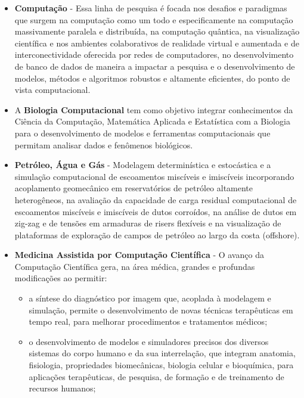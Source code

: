 \begin{itemize}
	\item \textbf{Computação} - Essa linha de pesquisa é focada nos desafios e
		paradigmas que surgem na computação como um todo e especificamente na
		computação massivamente paralela e distribuída, na computação quântica,
		na visualização científica e nos ambientes colaborativos de realidade
		virtual e aumentada e de interconectividade oferecida por redes de
		computadores, no desenvolvimento de banco de dados de maneira a impactar
		a pesquisa e o desenvolvimento de modelos, métodos e algoritmos robustos
		e altamente eficientes, do ponto de vista computacional.

	\item A \textbf{Biologia Computacional} tem como objetivo integrar
		conhecimentos da Ciência da Computação, Matemática Aplicada e
		Estatística com a Biologia para o desenvolvimento de modelos e
		ferramentas computacionais que permitam analisar dados e fenômenos
		biológicos. 

	\item \textbf{Petróleo, Água e Gás} - Modelagem determinística e estocástica
		e a simulação computacional de escoamentos miscíveis e imiscíveis
		incorporando acoplamento geomecânico em reservatórios de petróleo
		altamente heterogêneos, na avaliação da capacidade de carga residual
		computacional de escoamentos miscíveis e imiscíveis de dutos corroídos,
		na análise de dutos em zig-zag e de tensões em armaduras de risers
		flexíveis e na visualização de plataformas de exploração de campos de
		petróleo ao largo da costa (offshore).

	\item \textbf{Medicina Assistida por Computação Científica} - O avanço da
		Computação Científica gera, na área médica, grandes e profundas
		modificações ao permitir:
		\begin{itemize}

			\item a síntese do diagnóstico por imagem que, acoplada à modelagem
				e simulação, permite o desenvolvimento de novas técnicas
				terapêuticas em tempo real, para melhorar procedimentos e
				tratamentos médicos;

			\item o desenvolvimento de modelos e simuladores
				precisos dos diversos sistemas do corpo
				humano e da sua interrelação, que
				integram anatomia, fisiologia,
				propriedades biomecânicas, biologia
				celular e bioquímica, para aplicações
				terapêuticas, de pesquisa, de formação e
				de treinamento de recursos humanos;


\end{itemize}
\end{itemize}
